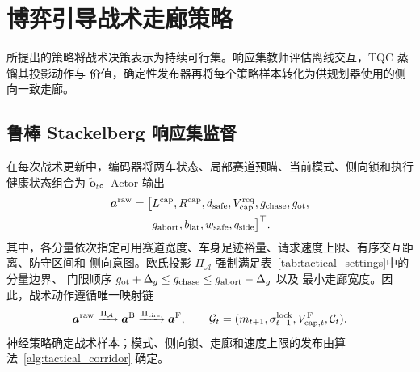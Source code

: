\documentclass[final,5p,twocolumn]{elsarticle}
\begin{document}
\section{博弈引导战术走廊策略}\label{sec:tactical}
所提出的策略将战术决策表示为持续可行集。响应集教师评估离线交互，TQC 蒸馏其投影动作与
价值，确定性发布器再将每个策略样本转化为供规划器使用的侧向一致走廊。

\subsection{鲁棒 Stackelberg 响应集监督}
\label{subsec:game_formulation}
在每次战术更新中，编码器将两车状态、局部赛道预瞄、当前模式、侧向锁和执行健康状态组合为
$\widetilde{\bm o}_t$。Actor 输出
\begin{equation}
\begin{aligned}
\bm a^{\rm raw}=\bigl[&L^{\rm cap},R^{\rm cap},d_{\rm safe},
V_{\rm cap}^{\rm req},g_{\rm chase},g_{\rm ot},\\
&g_{\rm abort},b_{\rm lat},w_{\rm safe},q_{\rm side}\bigr]^\top .
\end{aligned}
\label{eq:action_vec}
\end{equation}
其中，各分量依次指定可用赛道宽度、车身足迹裕量、请求速度上限、有序交互距离、防守区间和
侧向意图。欧氏投影 $\Pi_{\mathcal A}$ 强制满足表~\ref{tab:tactical_settings}中的分量边界、
门限顺序
$g_{\rm ot}+\Delta_g\le g_{\rm chase}\le g_{\rm abort}-\Delta_g$ 以及
最小走廊宽度。因此，战术动作遵循唯一映射链
\[
\bm a^{\rm raw}\xrightarrow{\Pi_{\mathcal A}}\bm a^{\rm B}
\xrightarrow{\Pi_{\rm tire}}\bm a^{\rm F},\qquad
\mathcal G_t=(m_{t+1},\sigma_{t+1}^{\rm lock},
V_{{\rm cap},t}^{\rm F},\mathcal C_t).
\]
神经策略确定战术样本；模式、侧向锁、走廊和速度上限的发布由算法~\ref{alg:tactical_corridor}
确定。
\end{document}
